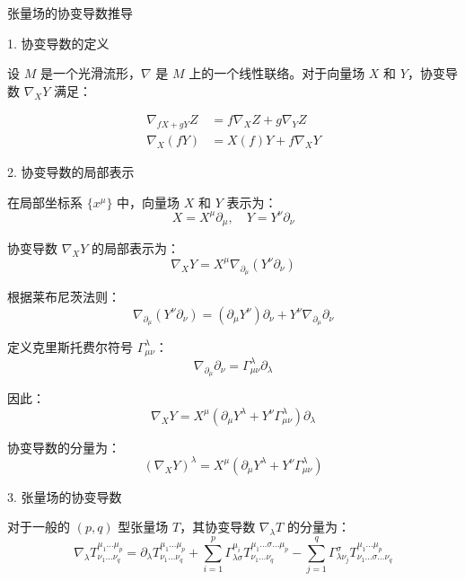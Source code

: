 \documentclass[12pt, a4paper, oneside, UTF8]{ctexbook}  %
\begin{document}
\begin{add}
张量场的协变导数推导

1. 协变导数的定义

设 $ M $ 是一个光滑流形，$ \nabla $ 是 $ M $ 上的一个线性联络。对于向量场 $ X $ 和 $ Y $，协变导数 $ \nabla_X Y $ 满足：

\begin{align*}
\nabla_{fX + gY} Z &= f \nabla_X Z + g \nabla_Y Z \\
\nabla_X (fY) &= X(f) Y + f \nabla_X Y
\end{align*}

2. 协变导数的局部表示

在局部坐标系 $ \{x^\mu\} $ 中，向量场 $ X $ 和 $ Y $ 表示为：
\[
X = X^\mu \partial_\mu, \quad Y = Y^\nu \partial_\nu\]

协变导数 $ \nabla_X Y $ 的局部表示为：
\[
\nabla_X Y = X^\mu \nabla_{\partial_\mu} (Y^\nu \partial_\nu)\]

根据莱布尼茨法则：
\[
\nabla_{\partial_\mu} (Y^\nu \partial_\nu) = (\partial_\mu Y^\nu) \partial_\nu + Y^\nu \nabla_{\partial_\mu} \partial_\nu\]

定义克里斯托费尔符号 $ \Gamma^\lambda_{\mu\nu} $：
\[
\nabla_{\partial_\mu} \partial_\nu = \Gamma^\lambda_{\mu\nu} \partial_\lambda\]

因此：
\[
\nabla_X Y = X^\mu \left( \partial_\mu Y^\lambda + Y^\nu \Gamma^\lambda_{\mu\nu} \right) \partial_\lambda\]

协变导数的分量为：
\[
(\nabla_X Y)^\lambda = X^\mu \left( \partial_\mu Y^\lambda + Y^\nu \Gamma^\lambda_{\mu\nu} \right)\]

3. 张量场的协变导数

对于一般的 $ (p, q) $ 型张量场 $ T $，其协变导数 $ \nabla_\lambda T $ 的分量为：
\[
\nabla_\lambda T^{\mu_1 \dots \mu_p}_{\nu_1 \dots \nu_q} = \partial_\lambda T^{\mu_1 \dots \mu_p}_{\nu_1 \dots \nu_q} 
+ \sum_{i=1}^p \Gamma^{\mu_i}_{\lambda \sigma} T^{\mu_1 \dots \sigma \dots \mu_p}_{\nu_1 \dots \nu_q} 
-\sum_{j=1}^q \Gamma^\sigma_{\lambda \nu_j} T^{\mu_1 \dots \mu_p}_{\nu_1 \dots \sigma \dots \nu_q}\]
\end{add}
\end{document}
